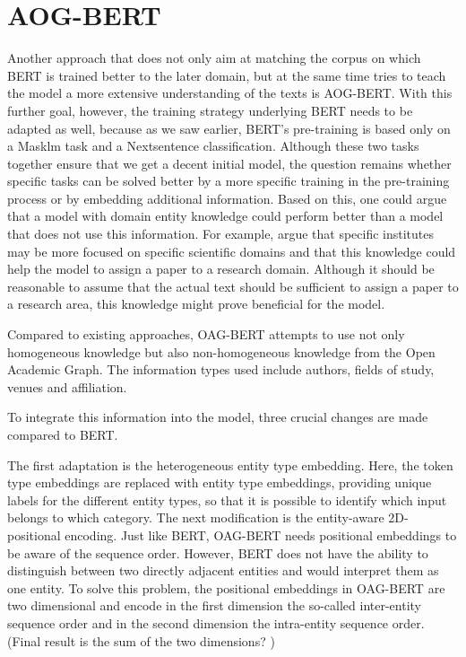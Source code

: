 \section{AOG-BERT}
	Another approach that does not only aim at matching the corpus on which BERT is trained better to the later domain, but at the same time tries to teach the model a more extensive understanding of the texts is AOG-BERT. With this further goal, however, the training strategy underlying BERT needs to be adapted as well, because as we saw earlier, BERT's pre-training is based only on a Masklm task and a Nextsentence classification. Although these two tasks together ensure that we get a decent initial model, the question remains whether specific tasks can be solved better by a more specific training in the pre-training process or by embedding additional information.
	Based on this, one could argue that a model with domain entity knowledge could perform better than a model that does not use this information. For example, \citeauthor{Liu2021} argue that specific institutes may be more focused on specific scientific domains and that this knowledge could help the model to assign a paper to a research domain. Although it should be reasonable to assume that the actual text should be sufficient to assign a paper to a research area, this knowledge might prove beneficial for the model.
	
	\color{red}
	Compared to existing approaches, OAG-BERT attempts to use not only homogeneous knowledge but also non-homogeneous knowledge from the Open Academic Graph. The information types used include authors, fields of study, venues and affiliation.
	
	To integrate this information into the model, three crucial changes are made compared to BERT.  
	
	The first adaptation is the heterogeneous entity type embedding. Here, the token type embeddings are replaced with entity type embeddings, providing unique labels for the different entity types, so that it is possible to identify which input belongs to which category.
	The next modification is the entity-aware 2D-positional encoding. Just like BERT, OAG-BERT needs positional embeddings to be aware of the sequence order. However, BERT does not have the ability to distinguish between two directly adjacent entities and would interpret them as one entity. To solve this problem, the positional embeddings in OAG-BERT are two dimensional and encode in the first dimension the so-called inter-entity sequence order and in the second dimension the intra-entity sequence order. (Final result is the sum of the two dimensions? )
	
